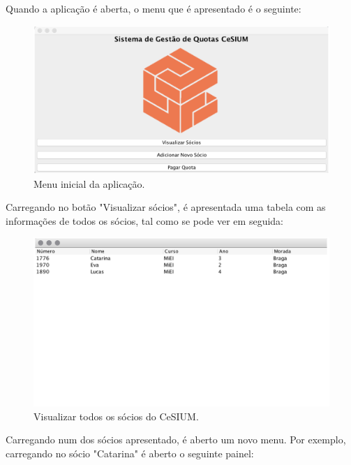 \documentclass[a4paper]{article}
\begin{document}
Quando a aplicação é aberta, o menu que é apresentado é o seguinte:

\begin{figure}[H]
\centering
\includegraphics[scale=0.35]{imgs/initialMenu.png}
\caption{Menu inicial da aplicação.}
\label{img:initialMenu}
\end{figure}

Carregando no botão "Visualizar sócios", é apresentada uma tabela com as informações de todos os sócios, tal como se pode ver em seguida:

\begin{figure}[H]
\centering
\includegraphics[scale=0.35]{imgs/visualizarSocios.png}
\caption{Visualizar todos os sócios do CeSIUM.}
\label{img:visualizarSocios}
\end{figure}

Carregando num dos sócios apresentado, é aberto um novo menu. Por exemplo, carregando no sócio "Catarina" é aberto o seguinte painel:
\end{document}
